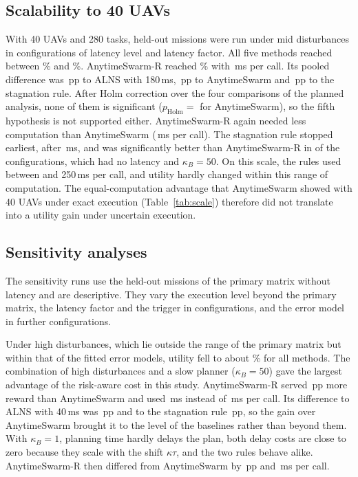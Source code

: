 \subsection{Scalability to 40 UAVs}\label{sec:res-xl}
With 40 UAVs and 280 tasks,  held-out missions were run under mid disturbances in 
configurations of latency level and latency factor. All five methods reached between \% and
\%. AnytimeSwarm-R reached \% with \,ms per call. Its pooled difference was
\,pp to ALNS with 180\,ms, \,pp to AnytimeSwarm and \,pp to the
stagnation rule. After Holm correction over the four comparisons of the planned analysis, none of them is
significant ($p_{\mathrm{Holm}}=$  for AnytimeSwarm), so the fifth hypothesis is not supported either.
AnytimeSwarm-R again needed less computation than AnytimeSwarm (\,ms per call). The stagnation rule
stopped earliest, after \,ms, and was significantly better than AnytimeSwarm-R in  of the
 configurations, which had no latency and $\kappa_B=50$. On this scale, the rules used between  and 250\,ms
per call, and utility hardly changed within this range of computation. The equal-computation advantage that
AnytimeSwarm showed with 40 UAVs under exact execution (Table~\ref{tab:scale}) therefore did not translate into a
utility gain under uncertain execution.

\subsection{Sensitivity analyses}\label{sec:res-sens}
The sensitivity runs use the held-out missions of the primary matrix without latency and are descriptive. They vary the
execution level beyond the primary matrix, the latency factor and the trigger in  configurations, and
the error model in  further configurations.

Under high disturbances, which lie outside the range of the primary matrix but within that of the fitted error models,
utility fell to about \% for all methods. The combination of high disturbances and a slow planner
($\kappa_B=50$) gave the largest advantage of the risk-aware cost in this study. AnytimeSwarm-R served
\,pp more reward than AnytimeSwarm and used \,ms instead of
\,ms per call. Its difference to ALNS with 40\,ms was \,pp and to
the stagnation rule \,pp, so the gain over AnytimeSwarm brought it to the level of the
baselines rather than beyond them. With $\kappa_B=1$, planning time hardly delays the plan, both delay costs are close to
zero because they scale with the shift $\kappa\tau$, and the two rules behave alike. AnytimeSwarm-R then differed from
AnytimeSwarm by \,pp and \,ms per call.

